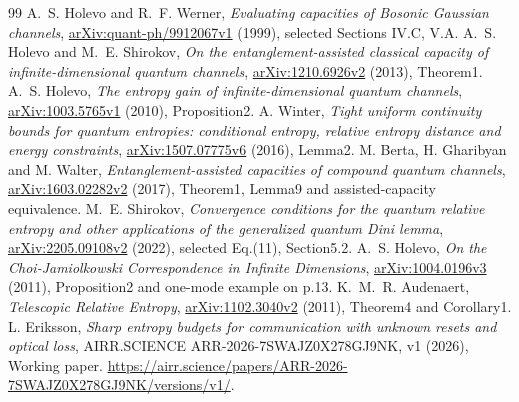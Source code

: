 \documentclass[11pt]{article}
\begin{document}
\begin{thebibliography}{99}\small
{} A.~S. Holevo and R.~F. Werner,
\emph{Evaluating capacities of Bosonic Gaussian channels},
\href{https://arxiv.org/abs/quant-ph/9912067v1}
{arXiv:quant-ph/9912067v1} (1999), selected Sections IV.C, V.A.
 A.~S. Holevo and M.~E. Shirokov,
\emph{On the entanglement-assisted classical capacity of
infinite-dimensional quantum channels},
\href{https://arxiv.org/abs/1210.6926v2}{arXiv:1210.6926v2}
(2013), Theorem1.
 A.~S. Holevo,
\emph{The entropy gain of infinite-dimensional quantum channels},
\href{https://arxiv.org/abs/1003.5765v1}{arXiv:1003.5765v1}
(2010), Proposition2.
 A. Winter,
\emph{Tight uniform continuity bounds for quantum entropies:
conditional entropy, relative entropy distance and energy constraints},
\href{https://arxiv.org/abs/1507.07775v6}{arXiv:1507.07775v6}
(2016), Lemma2.
 M. Berta, H. Gharibyan and M. Walter,
\emph{Entanglement-assisted capacities of compound quantum channels},
\href{https://arxiv.org/abs/1603.02282v2}{arXiv:1603.02282v2}
(2017), Theorem1, Lemma9 and assisted-capacity equivalence.
 M.~E. Shirokov,
\emph{Convergence conditions for the quantum relative entropy and other
applications of the generalized quantum Dini lemma},
\href{https://arxiv.org/abs/2205.09108v2}{arXiv:2205.09108v2}
(2022), selected Eq.(11), Section5.2.
 A.~S. Holevo,
\emph{On the Choi-Jamiolkowski Correspondence in Infinite Dimensions},
\href{https://arxiv.org/abs/1004.0196v3}{arXiv:1004.0196v3}
(2011), Proposition2 and one-mode example on p.13.
 K.~M.~R. Audenaert,
\emph{Telescopic Relative Entropy},
\href{https://arxiv.org/abs/1102.3040v2}{arXiv:1102.3040v2}
(2011), Theorem4 and Corollary1.
 L. Eriksson,
\emph{Sharp entropy budgets for communication with unknown resets and
optical loss}, AIRR.SCIENCE ARR-2026-7SWAJZ0X278GJ9NK, v1
(2026), Working paper.
\url{https://airr.science/papers/ARR-2026-7SWAJZ0X278GJ9NK/versions/v1/}.
\end{thebibliography}
\end{document}
